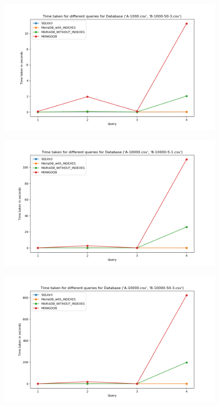 \documentclass[12pt]{article}
\begin{document}
\begin{figure}[H]
  \centering
  \includegraphics[width=.95\linewidth]{db_qry_time/6.png}
\end{figure}

\begin{figure}[H]
  \centering
  \includegraphics[width=.95\linewidth]{db_qry_time/7.png}
\end{figure}

\begin{figure}[H]
  \centering
  \includegraphics[width=.95\linewidth]{db_qry_time/8.png}
\end{figure}
\end{document}

